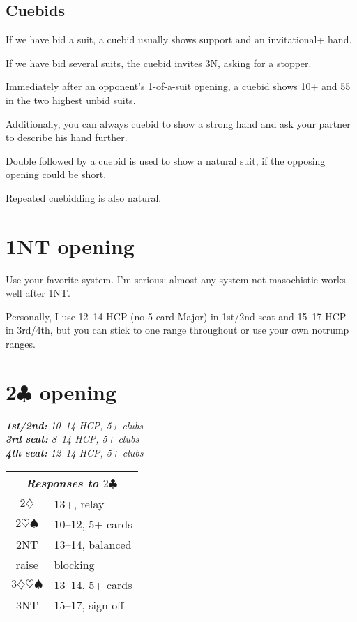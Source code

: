 \documentclass[a4paper, twoside, 11pt]{article}
\begin{document}
\begin{multicols}{3}
\subsection*{Cuebids}
If we have bid a suit, a cuebid usually shows support and an invitational+ hand.

If we have bid several suits, the cuebid invites 3N, asking for a stopper.

Immediately after an opponent's 1-of-a-suit opening, a cuebid shows 10+ and 55 in the two highest unbid suits.

Additionally, you can always cuebid to show a strong hand and ask your partner to describe his hand further.

Double followed by a cuebid is used to
show a natural suit, if the opposing opening could be short.

Repeated cuebidding is also natural.

\section{1NT opening}

\normalfont
Use your favorite system. I'm serious: almost any system not masochistic works well after \textnormal{1NT}.

Personally, I use 12--14 HCP (no 5-card Major) in 1st/2nd seat and 15--17 HCP in 3rd/4th, but you can stick to one range throughout or use your own notrump ranges.



\section{2$\clubsuit$ opening}


\emph{\textbf{1st/2nd:} 10--14 HCP, 5+ clubs \\
\textbf{3rd seat:} 8--14 HCP, 5+ clubs \\
\textbf{4th seat:} 12--14 HCP, 5+ clubs}

\begin{center}
\begin{tabular}{ |c|l| }
 \hline
 \multicolumn{2}{|c|}{\textit{Responses to $2\clubsuit$}} \\
 \hline
 $2\diamondsuit$ & 13+, relay\\
 $2\heartsuit\spadesuit$ & 10--12, 5+ cards\\
 \textnormal{2NT} &  13--14, balanced\\
 raise & blocking\\
 $3\diamondsuit\heartsuit\spadesuit$ & 13--14, 5+ cards \\
 \textnormal{3NT} & 15--17, sign-off \\
 \hline
\end{tabular}
\end{center}


\end{multicols}
\end{document}
